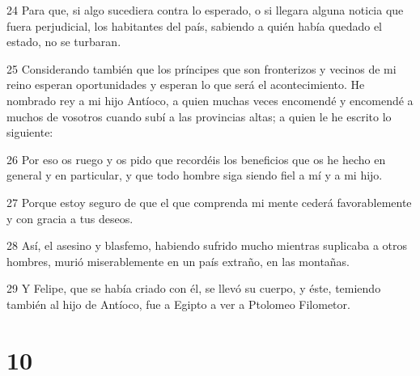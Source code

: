 \par 24 Para que, si algo sucediera contra lo esperado, o si llegara alguna noticia que fuera perjudicial, los habitantes del país, sabiendo a quién había quedado el estado, no se turbaran.
\par 25 Considerando también que los príncipes que son fronterizos y vecinos de mi reino esperan oportunidades y esperan lo que será el acontecimiento. He nombrado rey a mi hijo Antíoco, a quien muchas veces encomendé y encomendé a muchos de vosotros cuando subí a las provincias altas; a quien le he escrito lo siguiente:
\par 26 Por eso os ruego y os pido que recordéis los beneficios que os he hecho en general y en particular, y que todo hombre siga siendo fiel a mí y a mi hijo.
\par 27 Porque estoy seguro de que el que comprenda mi mente cederá favorablemente y con gracia a tus deseos.
\par 28 Así, el asesino y blasfemo, habiendo sufrido mucho mientras suplicaba a otros hombres, murió miserablemente en un país extraño, en las montañas.
\par 29 Y Felipe, que se había criado con él, se llevó su cuerpo, y éste, temiendo también al hijo de Antíoco, fue a Egipto a ver a Ptolomeo Filometor.

\chapter{10}

